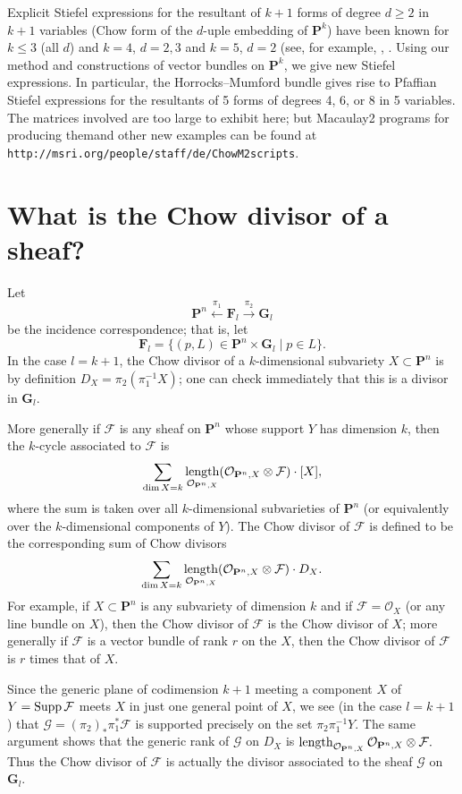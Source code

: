 \documentclass{jams-l}
\theoremstyle{definition}
\theoremstyle{remark}
\newcommand{\F}{{\mathcal F}}
\newcommand{\FF}{{\mathbf F}}
\newcommand{\G}{{\mathcal G}}
\newcommand{\GG}{{\mathbf G}}
\newcommand{\Ocal}{{\mathcal O}}
\newcommand{\PP}{{\mathbf P}}
\newcommand{\length}{\mathop{\rm length}}
\newcommand{\rTo}{\xrightarrow}
\newcommand{\lTo}{\xleftarrow}
\newcommand{\Supp}{\mathop{\rm Supp}}
\begin{document}
Explicit Stiefel expressions
for the resultant of $k+1$ forms of degree $d\geq 2$ in $k+1$ variables
(Chow form of the $d$-uple embedding of $\PP^k$) have been known
for $k\leq 3$ (all $d$) and $k=4$, $d=2,3$ and $k=5$, $d=2$ 
(see, for example,
\cite[Chapter 13, Prop.~1.6]{Gelfandetal.1994},
\cite{D'Andrea and Dickenstein 2001}. 
Using our method and constructions of vector bundles on $\PP^k$, we give new
Stiefel expressions.
In particular,
the Horrocks--Mumford bundle 
gives rise to Pfaffian Stiefel expressions for\linebreak
the resultants of 5 forms of degrees 4, 6, or 8 in 5 variables.
The matrices involved are too large to exhibit here; but
Macaulay2 programs
for producing them\linebreak and other new examples can be found at
\texttt{http://msri.org/people/staff/de/\linebreak ChowM2scripts}.

\section*{What is the Chow divisor of a sheaf?}


Let
\[
\PP^n \lTo{\pi_1} \FF_l  \rTo{\pi_2} \GG_l
\]  
be the incidence correspondence; that is, let 
\[
\FF_l = \{(p,L)\in \PP^n\times \GG_l \mid p\in L\}.
\] 
In the case
$l=k+1$, the Chow divisor of a
$k$-dimensional subvariety
$X\subset \PP^n$ is  by definition $D_X=\pi_2(\pi_1^{-1}X)$;
one can check immediately that this is a divisor in $\GG_l$.

More generally 
if $\F$ is any sheaf on $\PP^n$ whose
support $Y$ has dimension $k$, then the $k$-cycle associated
to $\F$ is 
\[
\sum_{\dim X = k} 
\length_{\Ocal_{\PP^n, X}} (\Ocal_{\PP^n,X}\otimes \F)\cdot [X],
\]
where the sum is taken over all 
$k$-dimensional subvarieties of
$\PP^n$ (or equivalently over the $k$-dimensional components
of $Y$).
The Chow divisor of $\F$ is defined to be the corresponding
sum of Chow divisors
\[
\sum_{\dim X = k} 
\length_{\Ocal_{\PP^n, X}} (\Ocal_{\PP^n,X}\otimes \F)\cdot D_X.
\]
For example, if $X\subset \PP^n$ 
is any subvariety of dimension $k$
and if $\F=\Ocal_X$ (or any line bundle on $X$),
then the Chow divisor of $\F$ is the Chow divisor of $X$;
more generally if $\F$ is a vector bundle of rank $r$
on the $X$, then the Chow divisor
of $\F$ is $r$ times that of $X$.


Since the generic plane of codimension $k+1$
meeting a component $X$ of $Y=\Supp \F$ meets $X$ in just
one general point of $X$, we see (in the case $l=k+1$)
that
$\G=(\pi_2)_*\pi_1^* \F$ is supported precisely on
the set $\pi_2\pi_1^{-1}Y$. The same argument shows
that the generic rank
of $\G$ on $D_X$ is 
$\length_{\Ocal_{\PP^n, X}} \Ocal_{\PP^n,X}\otimes \F.$
Thus the Chow divisor of $\F$ is actually the 
divisor associated to the sheaf $\G$ on $\GG_l$.
\end{document}
